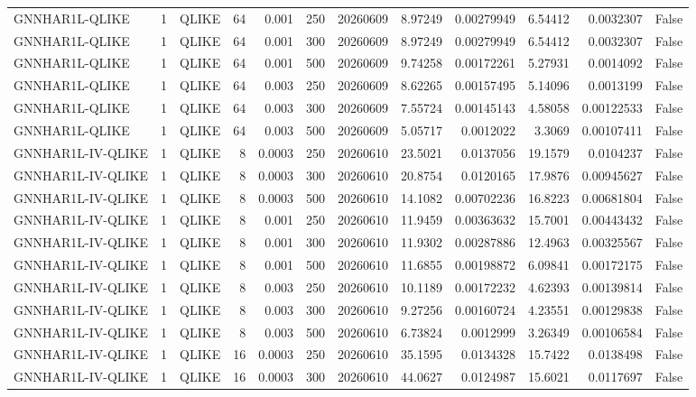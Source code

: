 \begin{tabular}{lrlrrrrrrrrr}
GNNHAR1L-QLIKE & 1 & QLIKE & 64 & 0.001 & 250 & 20260609 & 8.97249 & 0.00279949 & 6.54412 & 0.0032307 & False \\
GNNHAR1L-QLIKE & 1 & QLIKE & 64 & 0.001 & 300 & 20260609 & 8.97249 & 0.00279949 & 6.54412 & 0.0032307 & False \\
GNNHAR1L-QLIKE & 1 & QLIKE & 64 & 0.001 & 500 & 20260609 & 9.74258 & 0.00172261 & 5.27931 & 0.0014092 & False \\
GNNHAR1L-QLIKE & 1 & QLIKE & 64 & 0.003 & 250 & 20260609 & 8.62265 & 0.00157495 & 5.14096 & 0.0013199 & False \\
GNNHAR1L-QLIKE & 1 & QLIKE & 64 & 0.003 & 300 & 20260609 & 7.55724 & 0.00145143 & 4.58058 & 0.00122533 & False \\
GNNHAR1L-QLIKE & 1 & QLIKE & 64 & 0.003 & 500 & 20260609 & 5.05717 & 0.0012022 & 3.3069 & 0.00107411 & False \\
GNNHAR1L-IV-QLIKE & 1 & QLIKE & 8 & 0.0003 & 250 & 20260610 & 23.5021 & 0.0137056 & 19.1579 & 0.0104237 & False \\
GNNHAR1L-IV-QLIKE & 1 & QLIKE & 8 & 0.0003 & 300 & 20260610 & 20.8754 & 0.0120165 & 17.9876 & 0.00945627 & False \\
GNNHAR1L-IV-QLIKE & 1 & QLIKE & 8 & 0.0003 & 500 & 20260610 & 14.1082 & 0.00702236 & 16.8223 & 0.00681804 & False \\
GNNHAR1L-IV-QLIKE & 1 & QLIKE & 8 & 0.001 & 250 & 20260610 & 11.9459 & 0.00363632 & 15.7001 & 0.00443432 & False \\
GNNHAR1L-IV-QLIKE & 1 & QLIKE & 8 & 0.001 & 300 & 20260610 & 11.9302 & 0.00287886 & 12.4963 & 0.00325567 & False \\
GNNHAR1L-IV-QLIKE & 1 & QLIKE & 8 & 0.001 & 500 & 20260610 & 11.6855 & 0.00198872 & 6.09841 & 0.00172175 & False \\
GNNHAR1L-IV-QLIKE & 1 & QLIKE & 8 & 0.003 & 250 & 20260610 & 10.1189 & 0.00172232 & 4.62393 & 0.00139814 & False \\
GNNHAR1L-IV-QLIKE & 1 & QLIKE & 8 & 0.003 & 300 & 20260610 & 9.27256 & 0.00160724 & 4.23551 & 0.00129838 & False \\
GNNHAR1L-IV-QLIKE & 1 & QLIKE & 8 & 0.003 & 500 & 20260610 & 6.73824 & 0.0012999 & 3.26349 & 0.00106584 & False \\
GNNHAR1L-IV-QLIKE & 1 & QLIKE & 16 & 0.0003 & 250 & 20260610 & 35.1595 & 0.0134328 & 15.7422 & 0.0138498 & False \\
GNNHAR1L-IV-QLIKE & 1 & QLIKE & 16 & 0.0003 & 300 & 20260610 & 44.0627 & 0.0124987 & 15.6021 & 0.0117697 & False \\

\end{tabular}
